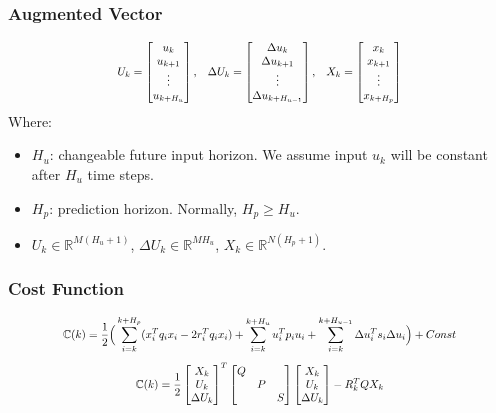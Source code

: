 \documentclass{beamer}
\newcommand\scalemath[2]{\scalebox{#1}{\mbox{\ensuremath{\displaystyle #2}}}}
\begin{document}
\begin{frame}
\frametitle{Augmented Vector}
\begin{equation}
\scalemath{0.8}{
U_k=
\begin{bmatrix}
u_k\\
u_{k+1}\\
\vdots \\
u_{k+H_u}
\end{bmatrix}
\text{,}\quad
\Delta U_k=
\begin{bmatrix}
\Delta u_k\\
\Delta u_{k+1}\\
\vdots \\
\Delta u_{k+H_{u-1}}
\end{bmatrix}
\text{,}\quad
X_k=
\begin{bmatrix}
x_k\\
x_{k+1}\\
\vdots \\
x_{k+H_p}
\end{bmatrix}\label{eq:aug}}
\end{equation}
Where:
\begin{itemize}
	\item $H_u$: changeable future input horizon. We assume input $u_k$ will be constant after $H_u$ time steps.
	\item $H_p$: prediction horizon. Normally, $H_p\geq H_u$. 
	\item $U_k \in \mathbb{R}^{M(H_{u}+1)}$, $\Delta U_k \in \mathbb{R}^{MH_{u}}$, $X_k \in \mathbb{R}^{N(H_{p}+1)}$.
\end{itemize}
\end{frame}
\begin{frame}
\frametitle{Cost Function}
\begin{equation}
\scalemath{0.8}{
\begin{split}
\mathbb{C}(k)=\frac{1}{2}\Big( \sum_{i=k}^{k+H_p}(x_i^Tq_ix_i-2r_i^Tq_ix_i)+\sum_{i=k}^{k+H_u}u_i^Tp_iu_i+\sum_{i=k}^{k+H_{u-1}}\Delta u_i^Ts_i\Delta u_i\Big)+Const
\label{eq:costf}
\end{split}}
\end{equation}
\begin{equation}
\scalemath{0.8}{
\mathbb{C}(k)=\frac{1}{2}
\begin{bmatrix}
X_k\\
U_k\\
\Delta U_k
\end{bmatrix}^T
\begin{bmatrix}
Q& & \\
 &P& \\
& &S 
\end{bmatrix}
\begin{bmatrix}
X_k\\
U_k\\
\Delta U_k
\end{bmatrix}
-
R_k^TQX_k}
\end{equation}
\end{frame}
\end{document}
